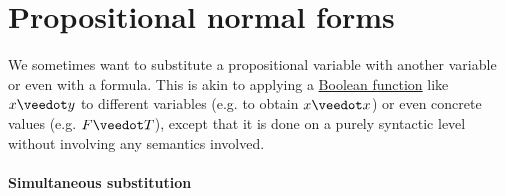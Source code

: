 \section{Propositional normal forms}\label{sec:propositional_normal_forms}

We sometimes want to substitute a propositional variable with another variable or even with a formula. This is akin to applying a \hyperref[def:boolean_function]{Boolean function} like \( x \synvee y \) to different variables (e.g. to obtain \( x \synvee x \)) or even concrete values (e.g. \( F \synvee T \)), except that it is done on a purely syntactic level without involving any semantics involved.

\paragraph{Simultaneous substitution}\hfill

